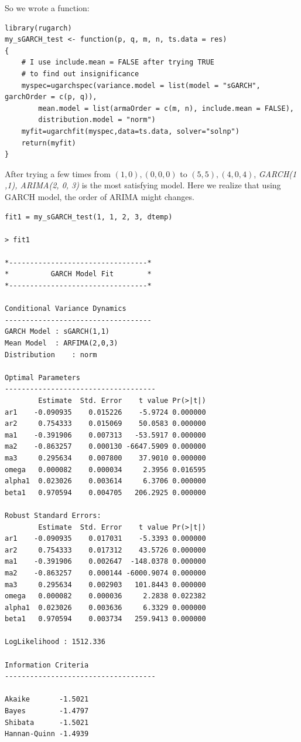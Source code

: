 \documentclass[a4paper, 11pt]{article}
\begin{document}
\indent So we wrote a function:
\begin{verbatim}
library(rugarch)
my_sGARCH_test <- function(p, q, m, n, ts.data = res)
{
	# I use include.mean = FALSE after trying TRUE
	# to find out insignificance
    myspec=ugarchspec(variance.model = list(model = "sGARCH", garchOrder = c(p, q)), 
    	mean.model = list(armaOrder = c(m, n), include.mean = FALSE), 
    	distribution.model = "norm")
    myfit=ugarchfit(myspec,data=ts.data, solver="solnp")
    return(myfit)  
}
\end{verbatim}
\indent After trying a few times from $(1, 0), (0, 0, 0)$ to $(5, 5), (4, 0, 4)$, \textit{GARCH(1 ,1), ARIMA(2, 0, 3)} is the most satisfying model. Here we realize that using GARCH model, the order of ARIMA might changes.
\begin{verbatim}
fit1 = my_sGARCH_test(1, 1, 2, 3, dtemp)

> fit1

*---------------------------------*
*          GARCH Model Fit        *
*---------------------------------*

Conditional Variance Dynamics 	
-----------------------------------
GARCH Model	: sGARCH(1,1)
Mean Model	: ARFIMA(2,0,3)
Distribution	: norm 

Optimal Parameters
------------------------------------
        Estimate  Std. Error    t value Pr(>|t|)
ar1    -0.090935    0.015226    -5.9724 0.000000
ar2     0.754333    0.015069    50.0583 0.000000
ma1    -0.391906    0.007313   -53.5917 0.000000
ma2    -0.863257    0.000130 -6647.5909 0.000000
ma3     0.295634    0.007800    37.9010 0.000000
omega   0.000082    0.000034     2.3956 0.016595
alpha1  0.023026    0.003614     6.3706 0.000000
beta1   0.970594    0.004705   206.2925 0.000000

Robust Standard Errors:
        Estimate  Std. Error    t value Pr(>|t|)
ar1    -0.090935    0.017031    -5.3393 0.000000
ar2     0.754333    0.017312    43.5726 0.000000
ma1    -0.391906    0.002647  -148.0378 0.000000
ma2    -0.863257    0.000144 -6000.9074 0.000000
ma3     0.295634    0.002903   101.8443 0.000000
omega   0.000082    0.000036     2.2838 0.022382
alpha1  0.023026    0.003636     6.3329 0.000000
beta1   0.970594    0.003734   259.9413 0.000000

LogLikelihood : 1512.336 

Information Criteria
------------------------------------
                    
Akaike       -1.5021
Bayes        -1.4797
Shibata      -1.5021
Hannan-Quinn -1.4939


\end{verbatim}
\end{document}
